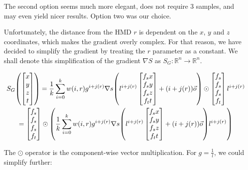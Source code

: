 The second option seems much more elegant, does not require 3 samples, and may even yield nicer results. Option two was our choice.

Unfortunately, the distance from the \ac{HMD} $r$ is dependent on the $x$, $y$ and $z$ coordinates, which makes the gradient overly complex. For that reason, we have decided to simplify the gradient by treating the $r$ parameter as a constant. We shall denote this simplification of the gradient $\nabla S$ as $S_G \colon \mathbb{R}^n \to \mathbb{R}^n$.

\begin{gather}
    S_G\mleft(\begin{bmatrix}x\\y\\z\\t\end{bmatrix}\mright) = \frac{1}{k} \sum_{i=0}^{k} w(i, r) g^{i+j(r)} \nabla s\mleft(l^{i+j(r)} \begin{bmatrix}f_sx\\f_sy\\f_sz\\f_tt\end{bmatrix} + (i + j(r)) \vec{o}\mright) \odot \begin{bmatrix}f_s\\f_s\\f_s\\f_t\end{bmatrix} l^{i+j(r)}\\
    = \begin{bmatrix}f_s\\f_s\\f_s\\f_t\end{bmatrix} \odot \mleft( \frac{1}{k} \sum_{i=0}^{k} w(i, r) g^{i+j(r)} \nabla s\mleft(l^{i+j(r)} \begin{bmatrix}f_sx\\f_sy\\f_sz\\f_tt\end{bmatrix} + (i + j(r)) \vec{o}\mright) l^{i+j(r)} \mright) \label{eq:grad1}
\end{gather}

The $\odot$ operator is the component-wise vector multiplication. For $g = \frac{1}{l}$, we could simplify further:

